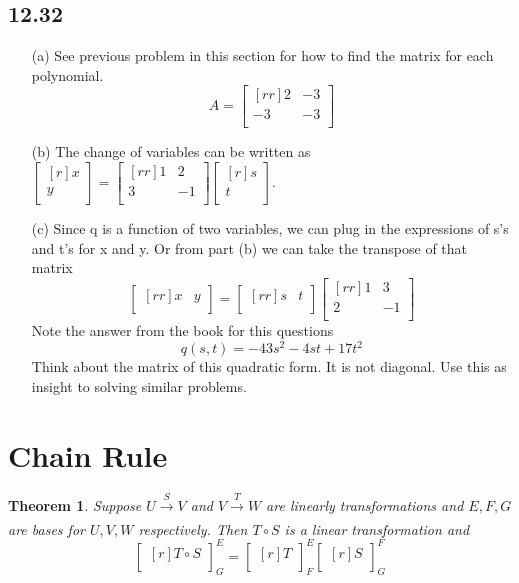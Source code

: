 \documentclass{report}
\theoremstyle{plain}
\newtheorem*{thrm}{Theorem}
\theoremstyle{definition}
\theoremstyle{plain}
\begin{document}
\subsection{12.32}
\begin{enumerate}
\item[(a)] See previous problem in this section for how to find the matrix for each polynomial.
\[ A=\begin{bmatrix}[rr]2&-3\\-3&-3\\\end{bmatrix} \]
\item[(b)] The change of variables can be written as $\begin{bmatrix}[r]x\\y\\\end{bmatrix}=\begin{bmatrix}[rr]1&2\\3&-1\\\end{bmatrix}\begin{bmatrix}[r]s\\t\\\end{bmatrix}$.
\item[(c)]Since q is a function of two variables, we can plug in the expressions of s's and t's for x and y. Or from part (b) we can take the transpose of that matrix
\[ \begin{bmatrix}[rr]x&y\\\end{bmatrix}=\begin{bmatrix}[rr]s&t\\\end{bmatrix}\begin{bmatrix}[rr]1&3\\2&-1\\\end{bmatrix} \]
Note the answer from the book for this questions
\[ q(s,t)=-43s^2-4st+17t^2\]
Think about the matrix of this quadratic form. It is not diagonal. Use this as insight to solving similar problems.
\end{enumerate}

\section{Chain Rule}
\begin{thrm}
Suppose $U\xrightarrow[]{S} V$ and $V\xrightarrow[]{T} W$ are linearly transformations and $E,F,G$ are bases for $U,V,W$ respectively. Then $T\circ S$ is a linear transformation and 
\[ \begin{bmatrix}[r]T\circ S\\\end{bmatrix}_G^E = \begin{bmatrix}[r]T\\\end{bmatrix}_F^E \begin{bmatrix}[r]S\\\end{bmatrix}_G^F \]
\end{thrm}
\end{document}
